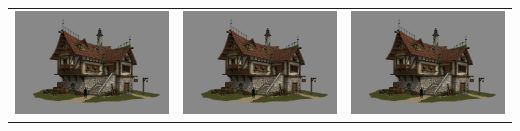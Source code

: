\documentclass[12pt]{article}
\begin{document}
\clearpage
\begin{tabular}{lcr}
    \includegraphics[scale = 0.3]{donghee-han-d2.jpg} & \includegraphics[scale = 0.3]{donghee-han-d2.jpg} & \includegraphics[scale = 0.3]{donghee-han-d2.jpg} \\[0.4cm]

\end{tabular}
\end{document}

